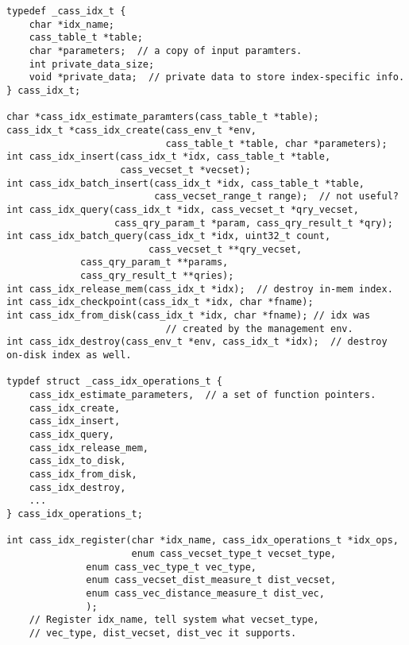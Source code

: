 \begin{verbatim}
typedef _cass_idx_t {
    char *idx_name;
    cass_table_t *table;
    char *parameters;  // a copy of input paramters.
    int private_data_size;
    void *private_data;  // private data to store index-specific info.
} cass_idx_t;

char *cass_idx_estimate_paramters(cass_table_t *table);
cass_idx_t *cass_idx_create(cass_env_t *env, 
                            cass_table_t *table, char *parameters);
int cass_idx_insert(cass_idx_t *idx, cass_table_t *table, 
                    cass_vecset_t *vecset);
int cass_idx_batch_insert(cass_idx_t *idx, cass_table_t *table, 
                          cass_vecset_range_t range);  // not useful?
int cass_idx_query(cass_idx_t *idx, cass_vecset_t *qry_vecset, 
                   cass_qry_param_t *param, cass_qry_result_t *qry);
int cass_idx_batch_query(cass_idx_t *idx, uint32_t count,
                         cass_vecset_t **qry_vecset,
			 cass_qry_param_t **params,
			 cass_qry_result_t **qries);
int cass_idx_release_mem(cass_idx_t *idx);  // destroy in-mem index.
int cass_idx_checkpoint(cass_idx_t *idx, char *fname);
int cass_idx_from_disk(cass_idx_t *idx, char *fname); // idx was
                            // created by the management env.
int cass_idx_destroy(cass_env_t *env, cass_idx_t *idx);  // destroy on-disk index as well.

typdef struct _cass_idx_operations_t { 
    cass_idx_estimate_parameters,  // a set of function pointers.
    cass_idx_create,
    cass_idx_insert,
    cass_idx_query,
    cass_idx_release_mem,
    cass_idx_to_disk,
    cass_idx_from_disk,
    cass_idx_destroy,
    ...
} cass_idx_operations_t;

int cass_idx_register(char *idx_name, cass_idx_operations_t *idx_ops, 
                      enum cass_vecset_type_t vecset_type, 
		      enum cass_vec_type_t vec_type, 
		      enum cass_vecset_dist_measure_t dist_vecset,
		      enum cass_vec_distance_measure_t dist_vec,
		      ); 
    // Register idx_name, tell system what vecset_type, 
    // vec_type, dist_vecset, dist_vec it supports.
\end{verbatim}
